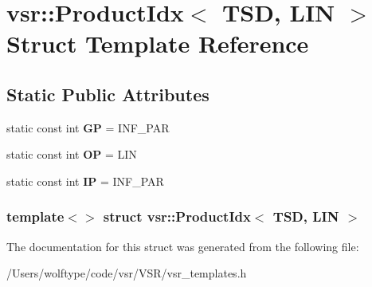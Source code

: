 \hypertarget{structvsr_1_1_product_idx_3_01_t_s_d_00_01_l_i_n_01_4}{\section{vsr\-:\-:Product\-Idx$<$ T\-S\-D, L\-I\-N $>$ Struct Template Reference}
\label{structvsr_1_1_product_idx_3_01_t_s_d_00_01_l_i_n_01_4}
}
\subsection*{Static Public Attributes}
\begin{DoxyCompactItemize}
\item 
\hypertarget{structvsr_1_1_product_idx_3_01_t_s_d_00_01_l_i_n_01_4_ace4b66d0ee939eff657945f4de70b00c}{static const int {\bfseries G\-P} = I\-N\-F\-\_\-\-P\-A\-R}\label{structvsr_1_1_product_idx_3_01_t_s_d_00_01_l_i_n_01_4_ace4b66d0ee939eff657945f4de70b00c}

\item 
\hypertarget{structvsr_1_1_product_idx_3_01_t_s_d_00_01_l_i_n_01_4_a5e970695fdd4656efc02f56f7398cab7}{static const int {\bfseries O\-P} = L\-I\-N}\label{structvsr_1_1_product_idx_3_01_t_s_d_00_01_l_i_n_01_4_a5e970695fdd4656efc02f56f7398cab7}

\item 
\hypertarget{structvsr_1_1_product_idx_3_01_t_s_d_00_01_l_i_n_01_4_a2977aa73195c28f2fd6bd4acfeb093e8}{static const int {\bfseries I\-P} = I\-N\-F\-\_\-\-P\-A\-R}\label{structvsr_1_1_product_idx_3_01_t_s_d_00_01_l_i_n_01_4_a2977aa73195c28f2fd6bd4acfeb093e8}

\end{DoxyCompactItemize}
\subsubsection*{template$<$$>$ struct vsr\-::\-Product\-Idx$<$ T\-S\-D, L\-I\-N $>$}



The documentation for this struct was generated from the following file\-:\begin{DoxyCompactItemize}
\item 
/\-Users/wolftype/code/vsr/\-V\-S\-R/vsr\-\_\-templates.\-h\end{DoxyCompactItemize}
